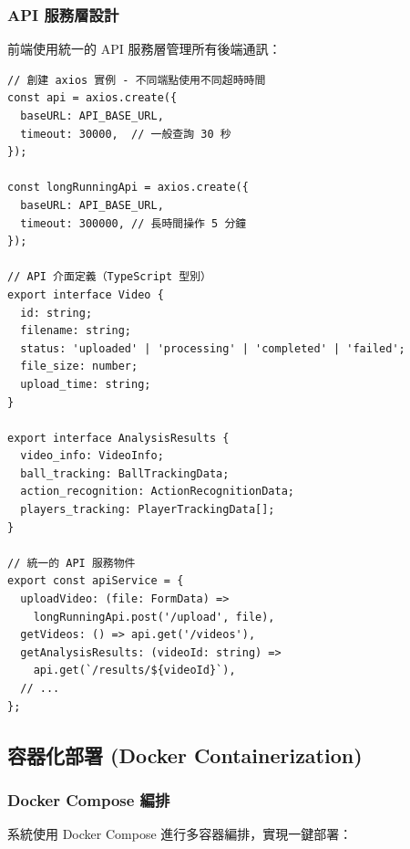 \documentclass[a4paper,14pt,oneside]{article}
\begin{document}
\subsubsection{API 服務層設計}

前端使用統一的 API 服務層管理所有後端通訊：

\begin{lstlisting}[style=jsstyle, caption={API 服務層設計}]
// 創建 axios 實例 - 不同端點使用不同超時時間
const api = axios.create({
  baseURL: API_BASE_URL,
  timeout: 30000,  // 一般查詢 30 秒
});

const longRunningApi = axios.create({
  baseURL: API_BASE_URL,
  timeout: 300000, // 長時間操作 5 分鐘
});

// API 介面定義（TypeScript 型別）
export interface Video {
  id: string;
  filename: string;
  status: 'uploaded' | 'processing' | 'completed' | 'failed';
  file_size: number;
  upload_time: string;
}

export interface AnalysisResults {
  video_info: VideoInfo;
  ball_tracking: BallTrackingData;
  action_recognition: ActionRecognitionData;
  players_tracking: PlayerTrackingData[];
}

// 統一的 API 服務物件
export const apiService = {
  uploadVideo: (file: FormData) =>
    longRunningApi.post('/upload', file),
  getVideos: () => api.get('/videos'),
  getAnalysisResults: (videoId: string) =>
    api.get(`/results/${videoId}`),
  // ...
};
\end{lstlisting}

\subsection{容器化部署 (Docker Containerization)}

\subsubsection{Docker Compose 編排}

系統使用 Docker Compose 進行多容器編排，實現一鍵部署：
\end{document}
